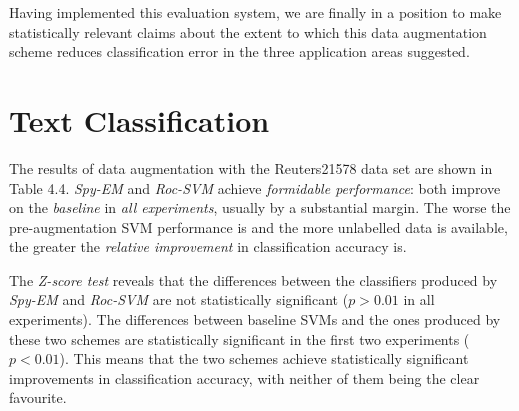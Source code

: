 \documentclass[12pt,twoside,notitlepage,amsart]{report} %
\begin{document}
Having implemented this evaluation system, we are finally in a position to make statistically relevant claims about the extent to which this data augmentation scheme reduces classification error in the three application areas suggested.
	
	
	\section{Text Classification}
	
The results of data augmentation with the Reuters21578 data set are shown in Table 4.4. \emph{Spy-EM} and \emph{Roc-SVM} achieve \emph{formidable performance}: both improve on the \emph{baseline} in \emph{all experiments}, usually by a substantial margin. The worse the pre-augmentation SVM performance is and the more unlabelled data is available, the greater the \emph{relative improvement} in classification accuracy is. 

The \emph{Z-score test} reveals that the differences between the classifiers produced by \emph{Spy-EM} and \emph{Roc-SVM} are {not statistically significant} ($p > 0.01$ in all experiments). The differences between baseline SVMs and the ones produced by these two schemes are statistically significant in the first two experiments ($p < 0.01$). This means that the two schemes achieve statistically significant improvements in classification accuracy, with neither of them being the clear favourite.  
\end{document}
